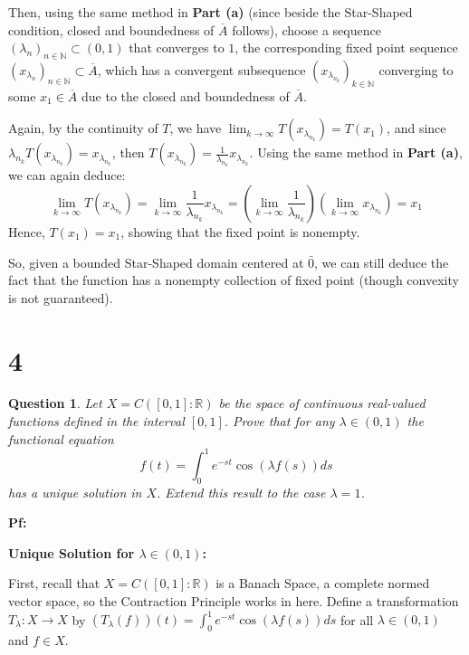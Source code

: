 \documentclass{article}
\newtheorem{question}{Question}
\begin{document}
\begin{itemize}
    Then, using the same method in \textbf{Part (a)} (since beside the Star-Shaped condition, closed and boundedness of $\overline{A}$ follows), choose a sequence $(\lambda_n)_{n\in\mathbb{N}}\subset (0,1)$ that converges to $1$,
    the corresponding fixed point sequence $(x_{\lambda_n})_{n\in\mathbb{N}}\subset \overline{A}$, which has a convergent subsequence $(x_{\lambda_{n_k}})_{k\in\mathbb{N}}$ converging to some $x_1\in \overline{A}$ due to the closed and boundedness of $\overline{A}$.

    Again, by the continuity of $T$, we have $\lim_{k\rightarrow\infty}T(x_{\lambda_{n_k}})=T(x_1)$, and since $\lambda_{n_k}T(x_{\lambda_{n_k}})=x_{\lambda_{n_k}}$, then $T(x_{\lambda_{n_k}})=\frac{1}{\lambda_{n_k}}x_{\lambda_{n_k}}$.
    Using the same method in \textbf{Part (a)}, we can again deduce:
    $$\lim_{k\rightarrow\infty}T(x_{\lambda_{n_k}}) = \lim_{k\rightarrow\infty}\frac{1}{\lambda_{n_k}}x_{\lambda_{n_k}} = \left(\lim_{k\rightarrow\infty}\frac{1}{\lambda_{n_k}}\right)(\lim_{k\rightarrow\infty}x_{\lambda_{n_k}}) = x_1$$
    Hence, $T(x_1)=x_1$, showing that the fixed point is nonempty.

    So, given a bounded Star-Shaped domain centered at $\bar{0}$, we can still deduce the fact that the function has a nonempty collection of fixed point (though convexity is not guaranteed).
\end{itemize}

\break

\section*{4}
\begin{myBox}[]{}
    \begin{question}
        Let $X=C([0,1]:\mathbb{R})$ be the space of continuous real-valued functions defined in the interval $[0,1]$.
        Prove that for any $\lambda\in (0,1)$ the functional equation
        $$f(t)=\int_{0}^{1}e^{-st}\cos(\lambda f(s))ds$$
        has a unique solution in $X$. Extend this result to the case $\lambda=1$.
    \end{question}
\end{myBox}

\textbf{Pf:}

\textbf{Unique Solution for $\lambda\in (0,1)$:}

First, recall that $X=C([0,1]:\mathbb{R})$ is a Banach Space, a complete normed vector space, so the Contraction Principle works in here.
Define a transformation $T_\lambda:X\rightarrow X$ by $(T_\lambda(f))(t)=\int_{0}^{1}e^{-st}\cos(\lambda f(s))ds$ for all $\lambda\in (0,1)$ and $f\in X$.
\end{document}
